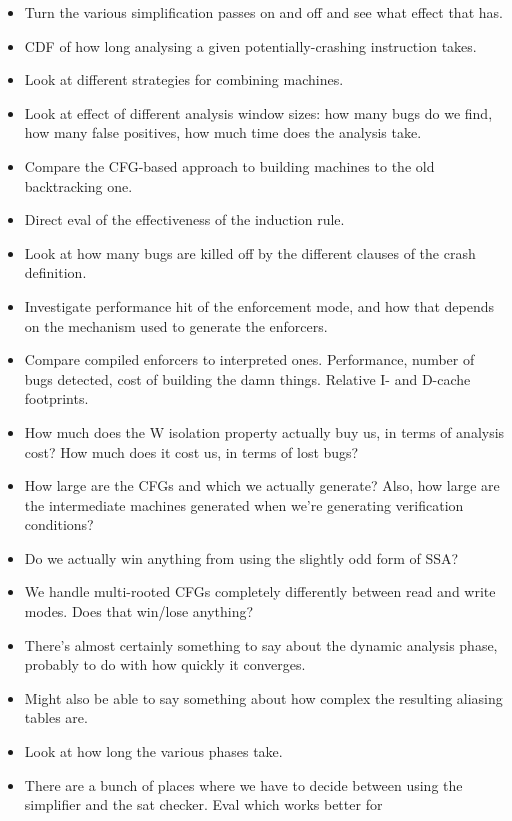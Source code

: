 \begin{itemize}
\item
  Turn the various simplification passes on and off and see what effect that has.
\item
  CDF of how long analysing a given potentially-crashing instruction takes.
\item
  Look at different strategies for combining machines.
\item
  Look at effect of different analysis window sizes: how many bugs do we find, how many false positives, how much time does the analysis take.
\item
  Compare the CFG-based approach to building machines to the old backtracking one.
\item
  Direct eval of the effectiveness of the induction rule.
\item
  Look at how many bugs are killed off by the different clauses of the crash definition.
\item
  Investigate performance hit of the enforcement mode, and how that depends on the mechanism used to generate the enforcers.
\item
  Compare compiled enforcers to interpreted ones.
  Performance, number of bugs detected, cost of building the damn things.
  Relative I- and D-cache footprints.
\item
  How much does the W isolation property actually buy us, in terms of analysis cost?
  How much does it cost us, in terms of lost bugs?
\item
  How large are the CFGs and \StateMachines which we actually generate?
  Also, how large are the intermediate machines generated when we're generating verification conditions?
\item
  Do we actually win anything from using the slightly odd form of SSA?
\item
  We handle multi-rooted CFGs completely differently between read and write modes.
  Does that win/lose anything?
\item
  There's almost certainly something to say about the dynamic analysis phase, probably to do with how quickly it converges.
\item
  Might also be able to say something about how complex the resulting aliasing tables are.
\item
  Look at how long the various phases take.
\item
  There are a bunch of places where we have to decide between using
  the simplifier and the sat checker.  Eval which works better for

\end{itemize}
